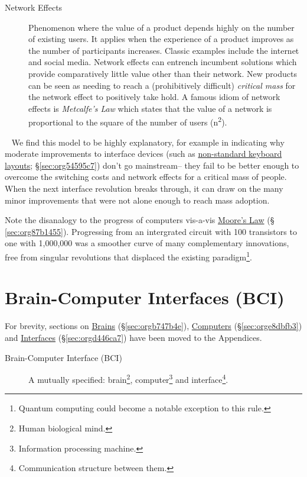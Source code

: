 \documentclass[logo,bsc,singlespacing,parskip]{infthesis}
\begin{document}
\begin{mdframed}
\begin{description}
\item[{Network Effects\label{network effects}}] Phenomenon where the value of a product depends highly on the number of existing users.
It applies when the experience of a product improves as the number of participants increases.
Classic examples include the internet and social media.
Network effects can entrench incumbent solutions which provide comparatively little value other than their network.
New products can be seen as needing to reach a (prohibitively difficult) \emph{critical mass} for the network effect to positively take hold.
A famous idiom of network effects is \emph{Metcalfe's Law} which states that the value of a network is proportional to the square of the number of users (n\textsuperscript{2}).
\end{description}
\end{mdframed}
~
We find this model to be highly explanatory, for example in indicating why moderate improvements to interface devices (such as \hyperref[sec:org54595c7]{non-standard keyboard layouts}; \S \ref{sec:org54595c7}) don't go mainstream-- they  fail to be better enough to overcome the switching costs and network effects for a critical mass of people.
When the next interface revolution breaks through, it can draw on the many minor improvements that were not alone enough to reach mass adoption.

Note the disanalogy to the progress of computers vis-a-vis \hyperref[sec:org87b1455]{Moore's Law} (§ \ref{sec:org87b1455}).
Progressing from an intergrated circuit with 100 transistors to one with 1,000,000 was a smoother curve of many complementary innovations, free from singular revolutions that displaced the existing paradigm\footnote{Quantum computing could become a notable exception to this rule.}.

\chapter{Brain-Computer Interfaces (BCI)}
\label{sec:orge068703}
For brevity, sections on \hyperref[sec:orgb747b4e]{Brains} (\S \ref{sec:orgb747b4e}), \hyperref[sec:orge8dbfb3]{Computers} (\S \ref{sec:orge8dbfb3}) and \hyperref[sec:orgd446ca7]{Interfaces} (\S \ref{sec:orgd446ca7}) have been moved to the Appendices.

\begin{mdframed}
\begin{description}
\item[{\label{org805b132}Brain-Computer Interface (BCI)}] A mutually specified: brain\footnote{Human biological mind.}, computer\footnote{Information processing machine.} and interface\footnote{Communication structure between them.}.
\end{description}
\end{mdframed}
\end{document}
